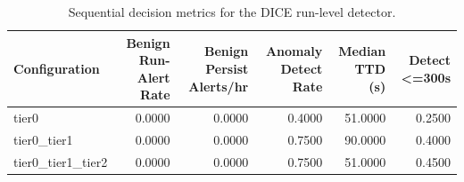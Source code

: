 \begin{table}[t]
\centering
\caption{Sequential decision metrics for the DICE run-level detector.}
\label{tab:dice_sequential_metrics}
\footnotesize
\begin{tabular}{lrrrrr}
\toprule
Configuration & Benign Run-Alert Rate & Benign Persist Alerts/hr & Anomaly Detect Rate & Median TTD (s) & Detect <=300s \\
\midrule
tier0 & 0.0000 & 0.0000 & 0.4000 & 51.0000 & 0.2500 \\
tier0_tier1 & 0.0000 & 0.0000 & 0.7500 & 90.0000 & 0.4000 \\
tier0_tier1_tier2 & 0.0000 & 0.0000 & 0.7500 & 51.0000 & 0.4500 \\
\bottomrule
\end{tabular}

\end{table}

